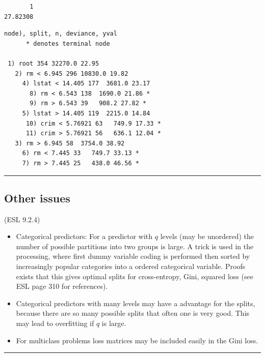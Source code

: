 \documentclass[
  letterpaper,
  DIV=11,
  numbers=noendperiod]{scrartcl}
\providecommand{\tightlist}{%
  \setlength{\itemsep}{0pt}\setlength{\parskip}{0pt}}\usepackage{longtable,booktabs,array}
\begin{document}
\begin{verbatim}
       1 
27.82308 
\end{verbatim}

\begin{verbatim}
node), split, n, deviance, yval
      * denotes terminal node

 1) root 354 32270.0 22.95  
   2) rm < 6.945 296 10830.0 19.82  
     4) lstat < 14.405 177  3681.0 23.17  
       8) rm < 6.543 138  1690.0 21.86 *
       9) rm > 6.543 39   908.2 27.82 *
     5) lstat > 14.405 119  2215.0 14.84  
      10) crim < 5.76921 63   749.9 17.33 *
      11) crim > 5.76921 56   636.1 12.04 *
   3) rm > 6.945 58  3754.0 38.92  
     6) rm < 7.445 33   749.7 33.13 *
     7) rm > 7.445 25   438.0 46.56 *
\end{verbatim}

\begin{center}\rule{0.5\linewidth}{0.5pt}\end{center}

\hypertarget{other-issues}{%
\subsection{Other issues}\label{other-issues}}

(ESL 9.2.4)

\begin{itemize}
\tightlist
\item
  Categorical predictors: For a predictor with \(q\) levels (may be
  unordered) the number of possible partitions into two groups is large.
  A trick is used in the processing, where first dummy variable coding
  is performed then sorted by increasingly popular categories into a
  ordered categorical variable. Proofs exists that this gives optimal
  splits for cross-entropy, Gini, squared loss (see ESL page 310 for
  references).
\item
  Categorical predictors with many levels may have a advantage for the
  splits, because there are so many possible splits that often one is
  very good. This may lead to overfitting if \(q\) is large.
\item
  For multiclass problems loss matrices may be included easily in the
  Gini loss.
\end{itemize}

\begin{center}\rule{0.5\linewidth}{0.5pt}\end{center}
\end{document}
